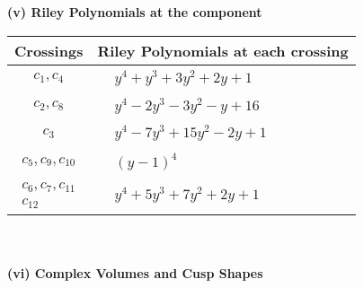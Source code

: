 \documentclass[1p]{elsarticle_modified}
\theoremstyle{definition}
\begin{document}
\newpage\renewcommand{\arraystretch}{1}
\flushleft \textbf{(v) Riley Polynomials at the component}\newline \\
\begin{tabular}{m{50pt}|m{274pt}}
Crossings & \hspace{64pt}Riley Polynomials at each crossing \\
\hline $$\begin{aligned}c_{1},c_{4}\end{aligned}$$&$\begin{aligned}
&y^4+y^3+3 y^2+2 y+1
\end{aligned}$\\
\hline $$\begin{aligned}c_{2},c_{8}\end{aligned}$$&$\begin{aligned}
&y^4-2 y^3-3 y^2- y+16
\end{aligned}$\\
\hline $$\begin{aligned}c_{3}\end{aligned}$$&$\begin{aligned}
&y^4-7 y^3+15 y^2-2 y+1
\end{aligned}$\\
\hline $$\begin{aligned}c_{5},c_{9},c_{10}\end{aligned}$$&$\begin{aligned}
&(y-1)^4
\end{aligned}$\\
\hline $$\begin{aligned}c_{6},c_{7},c_{11}\\c_{12}\end{aligned}$$&$\begin{aligned}
&y^4+5 y^3+7 y^2+2 y+1
\end{aligned}$\\
\hline
\end{tabular}\\~\\
\newpage\flushleft \textbf{(vi) Complex Volumes and Cusp Shapes}
\end{document}
